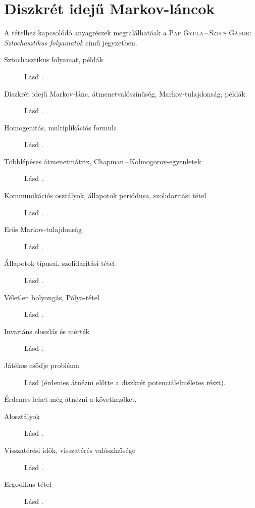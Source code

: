 \documentclass[DIV=15,appendixprefix]{scrreprt}
\theoremstyle{definition}
\theoremstyle{remark}
\begin{document}
\section{Diszkrét idejű Markov-láncok}
A tételhez kapcsolódó anyagrészek megtalálhatóak a \textsc{Pap Gyula\,--\,Szűcs Gábor}:
\emph{Sztochasztikus folyamatok} \cite{PapSzucs} című jegyzetben.
%
\begin{description}
	\item[Sztochasztikus folyamat, példák] Lásd \cite[3--4.~oldal]{PapSzucs}.
	\item[Diszkrét idejű Markov-lánc, átmenetvalószínűség, Markov-tulajdonság, példák] Lásd
		\cite[12--16.~oldal]{PapSzucs}.
	\item[Homogenitás, multiplikációs formula] Lásd \cite[19--20.~oldal]{PapSzucs}.
	\item[Többlépéses átmenetmátrix, Chapman\,--\,Kolmogorov-egyenletek] Lásd
		\cite[22.~oldal]{PapSzucs}.
	\item[Kommunikációs osztályok, állapotok periódusa, szolidaritási tétel] Lásd
		\cite[24--26.~oldal]{PapSzucs}.
	\item[Erős Markov-tulajdonság] Lásd \cite[29--30.~oldal]{PapSzucs}.
	\item[Állapotok típusai, szolidaritási tétel] Lásd \cite[39--44.~oldal]{PapSzucs}.
	\item[Véletlen bolyongás, Pólya-tétel] Lásd \cite[45--47.~oldal]{PapSzucs}.
	\item[Invariáns eloszlás és mérték] Lásd \cite[48--55.~oldal]{PapSzucs}.
	\item[Játékos csődje probléma] Lásd \cite[62--64.~oldal]{PapSzucs} (érdemes átnézni előtte a
		diszkrét potenciálelméletes részt).
\end{description}
Érdemes lehet még átnézni a következőket.
\begin{description}
	\item[Alosztályok] Lásd \cite[28.~oldal]{PapSzucs}.
	\item[Visszatérési idők, visszatérés valószínűsége] Lásd \cite[32.~oldal]{PapSzucs}.
	\item[Ergodikus tétel] Lásd \cite[55--57.~oldal]{PapSzucs}.
\end{description}
%
\end{document}

